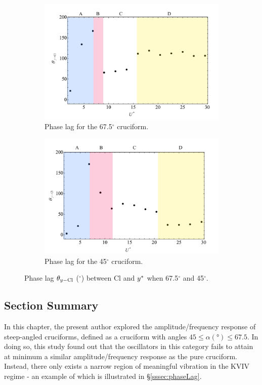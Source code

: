 \documentclass[oneside]{utmthesis}
\begin{document}
\begin{figure}
  \centering
  \begin{subfigure}[h]{1\textwidth}
    \includegraphics[width=\textwidth]{figs/phaseLag4}
    \caption{Phase lag for the 67.5$^{\circ}$ cruciform.}
    \label{fig:phaseLag675deg}
  \end{subfigure}
  
  \begin{subfigure}[h]{1\textwidth}
    \includegraphics[width=\textwidth]{figs/phaseLag3}
    \caption{Phase lag for the 45$^{\circ}$ cruciform.}
    \label{fig:phaseLag45deg}
  \end{subfigure}

  \caption{Phase lag $\theta_{y-\text{Cl}}$ ($^{\circ}$) between Cl and $y^{*}$ when 67.5$^{\circ}$ and 45$^{\circ}$.}
  \label{fig:phaseLag67545deg}
\end{figure}

\subsection{Section Summary} \label{ssec:secSumSteep}
In this chapter, the present author explored the amplitude/frequency response of steep-angled cruciforms, defined as a cruciform with angles $45 \leq \alpha (\si{\degree}) \leq 67.5$. In doing so, this study found out that the oscillators in this category fails to attain at minimum a similar amplitude/frequency response as the pure cruciform. Instead, there only exists a narrow region of meaningful vibration in the KVIV regime - an example of which is illustrated in \S\ref{sssec:phaseLag}.
\end{document}

